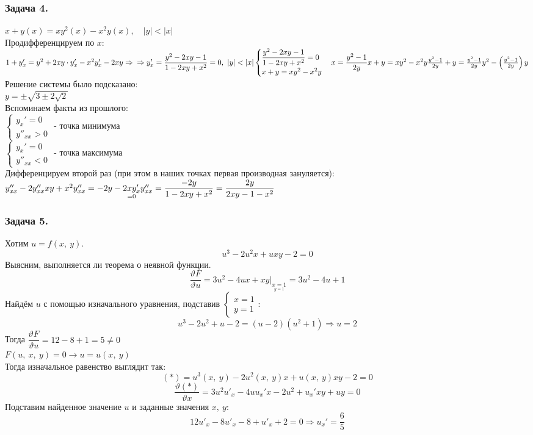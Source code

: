 \documentclass[12pt, letterpaper, twoside]{article}
\begin{document}
    \subsubsection*{Задача 4.}
    $x + y(x) = xy^2(x) - x^2y(x),\quad |y| < |x|$\\
    Продифференцируем по $x$: $1 + y_x' = y^2 + 2xy\cdot y_x' - x^2y'_x - 2xy\Rightarrow\\
    \Rightarrow y'_x = \dfrac{y^2-2xy-1}{1 - 2xy + x^2} = 0,\ |y| < |x|\\
    \begin{cases}
        \dfrac{y^2-2xy-1}{1 - 2xy + x^2} = 0\\
        x + y = xy^2 - x^2y
    \end{cases}\\
    x = \dfrac{y^2 - 1}{2y}\\
    x + y = x y^2 - x^2 y\\
    \frac{y^2 - 1}{2y} + y = \frac{y^2 - 1}{2y}y^2 - \left(\frac{y^2 - 1}{2y}\right)y$\\
    Решение системы было подсказано:\\
    $y = \pm\sqrt{3 \pm 2\sqrt{2}}$\\
    Вспоминаем факты из прошлого:\\
    $\begin{cases}
        y_x' = 0\\
        y''_{xx} > 0
    \end{cases}$ - точка минимума\\
    $\begin{cases}
        y_x' = 0\\
        y''_{xx} < 0
    \end{cases}$ - точка максимума\\
    Дифференцируем второй раз (при этом в наших точках первая производная зануляется):\\
    $y_{xx}'' - 2y_{xx}''xy + x^2y_{xx}'' = -2y - \underset{=0}{2xy'_x}\\
    y_{xx}'' = \dfrac{-2y}{1 - 2xy + x^2} = \dfrac{2y}{2xy - 1 - x^2}$
    \subsubsection*{Задача 5.}
    Хотим $u = f(x,\ y)$. \[u^3 - 2u^2x + uxy - 2 = 0\] Выясним, выполняется ли теорема о неявной функции.
    \[\frac{\vartheta F}{\vartheta u} = 3u^2 - 4ux + xy\big|_{\underset{y = 1}{x = 1}} = 3u^2 - 4u + 1\]
    Найдём $u$ с помощью изначального уравнения, подставив $\begin{cases}
        x = 1\\
        y = 1
    \end{cases}$:
    \[u^3 - 2u^2 + u - 2 = (u - 2)(u^2 + 1)\Rightarrow u = 2\]
    Тогда $\dfrac{\vartheta F}{\vartheta u} = 12 - 8 + 1 = 5\neq 0$\\
    $F(u,\ x,\ y) = 0\longrightarrow u = u(x,\ y)$\\
    Тогда изначальное равенство выглядит так:
    \[(*) = u^3(x,\ y) - 2u^2(x,\ y)x + u(x,\ y)xy - 2 = 0\]
    \[\frac{\vartheta (*)}{\vartheta x} = 3u^2u'_x - 4uu_x'x - 2u^2 + u_x'xy + uy = 0\]
    Подставим найденное значение $u$ и заданные значения $x,\ y$:
    \[12u'_x - 8u'_x - 8 + u'_x + 2 = 0\Rightarrow u_x' = \frac{6}{5}\]
\end{document}
